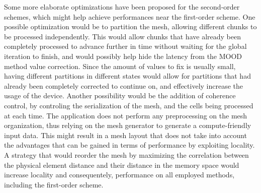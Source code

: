 Some more elaborate optimizations have been proposed for the second-order schemes, which might help achieve performances near the first-order scheme. One possible optimization would be to partition the mesh, allowing different chunks to be processed independently. This would allow chunks that have already been completely processed to advance further in time without waiting for the global iteration to finish, and would possibly help hide the latency from the MOOD method value correction. Since the amount of values to fix is usually small, having different partitions in different states would allow for partitions that had already been completely corrected to continue on, and effectively increase the usage of the device.
Another possibility would be the addition of coherence control, by controling the serialization of the mesh, and the cells being processed at each time. The application does not perform any preprocessing on the mesh organization, thus relying on the mesh generator to generate a compute-friendly input data. This might result in a mesh layout that does not take into account the advantages that can be gained in terms of performance by exploiting locality. A strategy that would reorder the mesh by maximizing the correlation between the physical element distance and their distance in the memory space would increase locality and consequentely, performance on all employed methods, including the first-order scheme.
